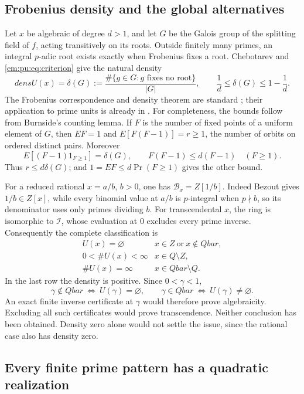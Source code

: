 \documentclass[11pt,a4paper]{article}
\newcommand{\Q}{\mathbb Q}
\newcommand{\Z}{\mathbb Z}
\newcommand{\QB}{\overline{\mathbb Q}}
\newcommand{\Qbar}{\overline{\mathbb Q}}
\theoremstyle{definition}
\theoremstyle{remark}
\theoremstyle{plain}
\numberwithin{equation}{section}
\def\Qbar{Qbar}\def\QB{Qbar}\def\mathbb#1{#1}%
\def\operatorname#1{#1}\def\mathrm#1{#1}}
\begin{document}
\subsection{Frobenius density and the global alternatives}

Let $x$ be algebraic of degree $d>1$, and let $G$ be the Galois
group of the splitting field of $f$, acting transitively on its
roots.  Outside finitely many primes, an integral $p$-adic root
exists exactly when Frobenius fixes a root.  Chebotarev and
\eqref{em:pu:eq:criterion} give the natural density
\[
 \operatorname{dens}U(x)=
 \delta(G):=\frac{\#\{g\in G:g\text{ fixes no root}\}}{|G|},
 \qquad \frac1d\le\delta(G)\le1-\frac1d.
\]
The Frobenius correspondence and density theorem are standard
\cite{Milne}; their application to prime units is already in
\cite{KM}.  For completeness, the bounds follow from Burnside's
counting lemma.  If $F$ is the number of fixed points of a uniform
element of $G$, then $\mathbb EF=1$ and
$\mathbb E[F(F-1)]=r\ge1$, the number of orbits on ordered
distinct pairs.  Moreover
\[
 \mathbb E[(F-1)1_{F\ge1}]=\delta(G),\qquad
 F(F-1)\le d(F-1)\quad(F\ge1).
\]
Thus $r\le d\delta(G)$; and
$1=\mathbb EF\le d\Pr(F\ge1)$ gives the other bound.

For a reduced rational $x=a/b$, $b>0$, one has
$\mathcal B_x=\Z[1/b]$.  Indeed Bezout gives $1/b\in\Z[x]$,
while every binomial value at $a/b$ is $p$-integral when $p\nmid b$,
so its denominator uses only primes dividing $b$.
For transcendental $x$, the ring is isomorphic to $\mathcal I$,
whose evaluation at $0$ excludes every prime inverse.  Consequently
the complete classification is
\[
 \begin{array}{c|l}
 U(x)=\varnothing&x\in\Z\ \text{or}\ x\notin\Qbar,\\
 0<\#U(x)<\infty&x\in\Q\setminus\Z,\\
 \#U(x)=\infty&x\in\Qbar\setminus\Q.
 \end{array}
\]
In the last row the density is positive.  Since $0<\gamma<1$,
\[
 \gamma\notin\Qbar\ \Longleftrightarrow\ U(\gamma)=\varnothing,
 \qquad
 \gamma\in\Qbar\ \Longleftrightarrow\ U(\gamma)\ne\varnothing.
\]
An exact finite inverse certificate at $\gamma$ would therefore
prove algebraicity.  Excluding all such certificates would prove
transcendence.  Neither conclusion has been obtained.  Density
zero alone would not settle the issue, since the rational case
also has density zero.

\subsection{Every finite prime pattern has a quadratic realization}
\end{document}
